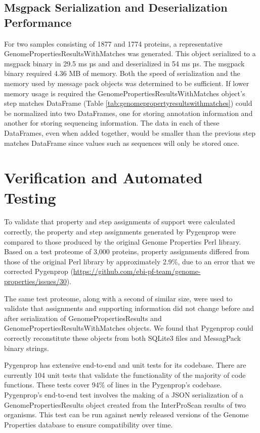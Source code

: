 \subsection{Msgpack Serialization and Deserialization Performance} \label{messagepack-performance}

For two samples consisting of 1877 and 1774 proteins, a representative GenomePropertiesResultsWithMatches was generated. This object serialized to a msgpack binary in 29.5 ms  µs and and deserialized in 54 ms  µs. The msgpack binary required 4.36 MB of memory. Both the speed of serialization and the memory used by message pack objects was determined to be sufficient. If lower memory usage is required the GenomePropertiesResultsWithMatches object's step matches DataFrame (Table \ref{tab:genomepropertyresultswithmatches}) could be normalized into two DataFrames, one for storing annotation information and another for storing sequencing information. The data in each of these DataFrames, even when added together, would be smaller than the previous step matches DataFrame since values such as sequences will only be stored once.

\section{Verification and Automated Testing}

To validate that property and step assignments of support were calculated correctly, the property and step assignments generated by Pygenprop were compared to those produced by the original Genome Properties Perl library. Based on a test proteome of 3,000 proteins, property assignments differed from those of the original Perl library by approximately 2.9\%, due to an error that we corrected Pygenprop (\href{https://github.com/ebi-pf-team/genome-properties/issues/30}{https://github.com/ebi-pf-team/genome-properties/issues/30}).

The same test proteome, along with a second of similar size, were used to validate that assignments and supporting information did not change before and after serialization of GenomePropertiesResults and GenomePropertiesResultsWithMatches objects. We found that Pygenprop could correctly reconstitute these objects from both SQLite3 files and MessagPack binary strings.

Pygenprop has extensive end-to-end and unit tests for its codebase. There are currently 104 unit tests that validate the functionality of the majority of code functions. These tests cover 94\% of lines in the Pygenprop's codebase. Pygenprop's end-to-end test involves the making of a JSON serialization of a GenomePropertiesResults object created from the InterProScan results of two organisms. This test can be run against newly released versions of the Genome Properties database to ensure compatibility over time. 

